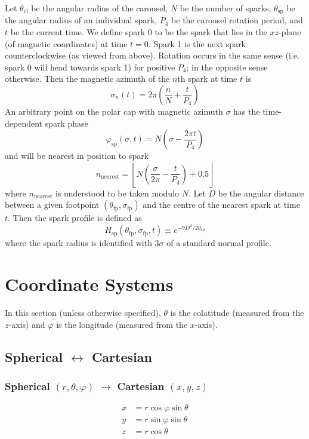 \documentclass{article}
\newcommand{\phase}{\varphi}
\begin{document}
Let $\theta_\text{cl}$ be the angular radius of the carousel, $N$ be the number of sparks, $\theta_\text{sp}$ be the angular radius of an individual spark, $P_4$ be the carousel rotation period, and $t$ be the current time.
We define spark $0$ to be the spark that lies in the $xz$-plane (of magnetic coordinates) at time $t=0$.
Spark 1 is the next spark counterclockwise (as viewed from above).
Rotation occurs in the same sense (i.e. spark 0 will head towards spark 1) for positive $P_4$; in the opposite sense otherwise.
Then the magnetic azimuth of the $n$th spark at time $t$ is
\begin{equation}
    \sigma_n(t) = 2\pi\left(\frac{n}{N} + \frac{t}{P_4}\right)
\end{equation}
An arbitrary point on the polar cap with magnetic azimuth $\sigma$ has the time-dependent spark phase
\begin{equation}
    \phase_\text{sp}(\sigma,t) = N\left(\sigma - \frac{2\pi t}{P_4}\right)
\end{equation}
and will be nearest in position to spark
\begin{equation}
    n_\text{nearest} = \left\lfloor N\left(\frac{\sigma}{2\pi} - \frac{t}{P_4}\right) + 0.5 \right\rfloor
\end{equation}
where $n_\text{nearest}$ is understood to be taken modulo $N$.
Let $D$ be the angular distance between a given footpoint $(\theta_\text{fp},\sigma_\text{fp})$ and the centre of the nearest spark at time $t$.
Then the spark profile is defined as
\begin{equation}
    H_\text{sp}(\theta_\text{fp},\sigma_\text{fp},t) \equiv e^{-9D^2/2\theta_\text{sp}}
\end{equation}
where the spark radius is identified with $3\sigma$ of a standard normal profile.

\section{Coordinate Systems}

In this section (unless otherwise specified), $\theta$ is the colatitude (measured from the $z$-axis) and $\phase$ is the longitude (measured from the $x$-axis).

\subsection{Spherical $\leftrightarrow$ Cartesian}

\subsubsection{Spherical $(r,\theta,\phase)$ $\rightarrow$ Cartesian $(x,y,z)$}
\begin{equation}
    \begin{aligned}
        x &= r \cos\phase\sin\theta \\
        y &= r \sin\phase\sin\theta \\
        z &= r \cos\theta
    \end{aligned}
\end{equation}
\end{document}

